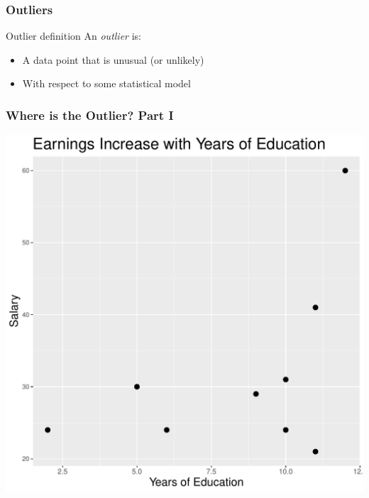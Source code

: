 \documentclass[12pt, block=fill]{beamer}
\begin{document}
\begin{frame}
  \frametitle{Outliers}

  \begin{block}{Outlier definition}
    An \textit{outlier} is:

  \begin{itemize}
  \item A data point that is unusual (or unlikely) \pause
  \item With respect to some statistical model
  \end{itemize}

  \end{block}

\end{frame}


\begin{frame}
  \frametitle{Where is the Outlier? Part I}
  \begin{center}
    \includegraphics[height=.95\textheight]{figures/salary_no_summary.pdf}
  \end{center}
\end{frame}
\end{document}
